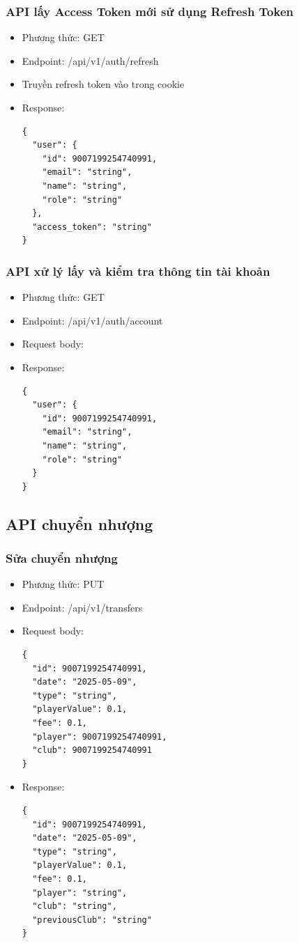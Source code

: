 \documentclass[../BTL.tex]{subfiles}
\begin{document}
\subsubsection{ API lấy Access Token mới sử dụng Refresh Token}
\begin{itemize}
    \item Phương thức: GET
    \item Endpoint: /api/v1/auth/refresh
    \item Truyền refresh token vào trong cookie
    \item Response:
        \begin{verbatim}          
{
  "user": {
    "id": 9007199254740991,
    "email": "string",
    "name": "string",
    "role": "string"
  },
  "access_token": "string"
}
        \end{verbatim}
\end{itemize}
\subsubsection{ API xử lý lấy và kiểm tra thông tin tài khoản}
\begin{itemize}
    \item Phương thức: GET
    \item Endpoint: /api/v1/auth/account
    \item Request body: 
    \item Response:
        \begin{verbatim}          
{
  "user": {
    "id": 9007199254740991,
    "email": "string",
    "name": "string",
    "role": "string"
  }
}
        \end{verbatim}
\end{itemize}
\subsection{ API chuyển nhượng}
\subsubsection{ Sửa chuyển nhượng}
\begin{itemize}
    \item Phương thức: PUT
    \item Endpoint: /api/v1/transfers
    \item Request body: 
        \begin{verbatim}
{
  "id": 9007199254740991,
  "date": "2025-05-09",
  "type": "string",
  "playerValue": 0.1,
  "fee": 0.1,
  "player": 9007199254740991,
  "club": 9007199254740991
}
        \end{verbatim}
    \item Response:
        \begin{verbatim}          
{
  "id": 9007199254740991,
  "date": "2025-05-09",
  "type": "string",
  "playerValue": 0.1,
  "fee": 0.1,
  "player": "string",
  "club": "string",
  "previousClub": "string"
}
        \end{verbatim}
\end{itemize}
\end{document}
